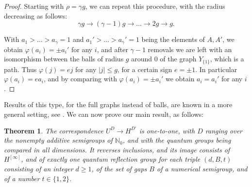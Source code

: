 \documentclass[11pt,a4paper]{article}
\newtheorem{thm}{Theorem}[section]
\begin{document}
\begin{proof}
Starting with $\rho=\gamma g$, we can repeat this procedure, with the radius decreasing as follows:
\[
 \gamma g\to(\gamma-1)g\to\ldots\to2g\to g.
\]

With $a_1>\ldots>a_\gamma=1$ and $a_1'>\ldots>a_\gamma'=1$ being the elements of $A,A'$, we obtain $\varphi(a_i)=\pm a_i'$ for any $i$, and after $\gamma-1$ removals we are left with an isomorphism between the balls of radius $g$ around $0$ of the graph $Y_{\{1\}}$, which is a path. Thus $\varphi(j)=ej$ for any $|j|\leq g$, for a certain sign $e=\pm1$. In particular $\varphi(a_i)=ea_i$, and by comparing with $\varphi(a_i)=\pm a_i'$ we obtain $a_i=a_i'$ for any $i$.
\end{proof}

Results of this type, for the full graphs instead of balls, are known in a more general setting, see \cite{morris}. We can now prove our main result, as follows:

\begin{thm}\label{main}
The correspondence $U^D\to H^{D'}$ is one-to-one, with $D$ ranging over the nonempty additive semigroups of $\mathbb N_0$, and with the quantum groups being compared in all dimensions. It reverses inclusions, and its image consists of $H^{[\infty]}$, and of exactly one quantum reflection group for each triple $(d,B,t)$ consisting of an integer $d\geq1$, of the set of gaps $B$ of a numerical semigroup, and of a number $t\in\{1,2\}$.
\end{thm}
\end{document}
